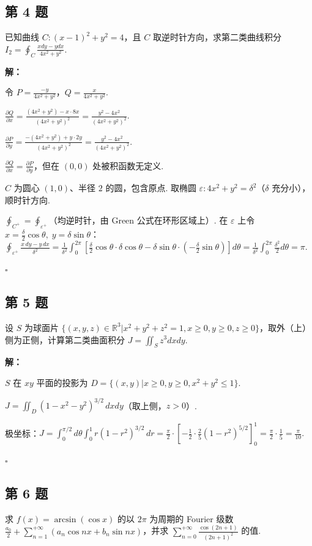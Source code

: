 \documentclass[12pt,a4paper]{article}
\newenvironment{sol}[1][解]{%
  \par\medskip\noindent\textbf{#1：}\itshape\par\noindent\ignorespaces
}{%
  \par\hfill$\square$\par\medskip
}
\begin{document}
\subsection*{第 4 题}
已知曲线 $C: (x-1)^2+y^2=4$，且 $C$ 取逆时针方向，求第二类曲线积分
$I_2=\oint_{C}\frac{xdy-ydx}{4x^2+y^2}$.

\begin{sol}令 $P=\frac{-y}{4x^2+y^2}$，$Q=\frac{x}{4x^2+y^2}$.

  $\frac{\partial Q}{\partial x}=\frac{(4x^2+y^2)-x\cdot
  8x}{(4x^2+y^2)^2}=\frac{y^2-4x^2}{(4x^2+y^2)^2}$.

  $\frac{\partial P}{\partial y}=\frac{-(4x^2+y^2)+y\cdot
  2y}{(4x^2+y^2)^2}=\frac{y^2-4x^2}{(4x^2+y^2)^2}$.

  $\frac{\partial Q}{\partial x}=\frac{\partial P}{\partial y}$，但在
  $(0,0)$ 处被积函数无定义.

  $C$ 为圆心 $(1,0)$、半径 $2$ 的圆，包含原点. 取椭圆 $\varepsilon:
  4x^2+y^2=\delta^2$（$\delta$ 充分小），顺时针方向.

  $\oint_{C^+}=\oint_{\varepsilon^+}$（均逆时针，由 Green 公式在环形区域上）. 在
  $\varepsilon$ 上令 $x=\frac{\delta}{2}\cos\theta,\; y=\delta\sin\theta$：
  $\oint_{\varepsilon^+}\frac{x\,dy-y\,dx}{\delta^2}=\frac{1}{\delta^2}\int_0^{2\pi}\left[\frac{\delta}{2}\cos\theta\cdot\delta\cos\theta-\delta\sin\theta\cdot(-\frac{\delta}{2}\sin\theta)\right]d\theta=\frac{1}{\delta^2}\int_0^{2\pi}\frac{\delta^2}{2}d\theta=\pi.$

\end{sol}
\subsection*{第 5 题}
设 $S$ 为球面片 $\{(x,y,z)\in\mathbb{R}^3|x^2+y^2+z^2=1, x\ge0, y\ge0,
z\ge0\}$，取外（上）侧为正侧，计算第二类曲面积分 $J=\iint_{S}z^3dxdy$.

\begin{sol}$S$ 在 $xy$ 平面的投影为 $D=\{(x,y)|x\ge 0,y\ge 0,x^2+y^2\le 1\}$.

  $J=\iint_D(1-x^2-y^2)^{3/2}\,dxdy$（取上侧，$z>0$）.

  极坐标：$J=\int_0^{\pi/2}d\theta\int_0^1
  r(1-r^2)^{3/2}\,dr=\frac{\pi}{2}\cdot\left[-\frac{1}{2}\cdot\frac{2}{5}(1-r^2)^{5/2}\right]_0^1=\frac{\pi}{2}\cdot\frac{1}{5}=\frac{\pi}{10}.$

\end{sol}
\subsection*{第 6 题}
求 $f(x)=\arcsin(\cos x)$ 的以 $2\pi$ 为周期的 Fourier 级数
$\frac{a_0}{2}+\sum_{n=1}^{+\infty}(a_n\cos nx+b_n\sin nx)$，并求
$\sum_{n=0}^{+\infty}\frac{\cos(2n+1)}{(2n+1)^2}$ 的值.
\end{document}
